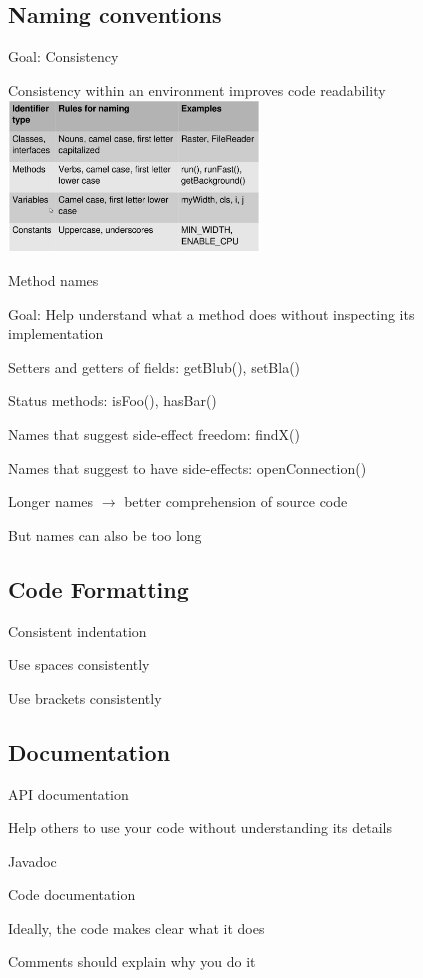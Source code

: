 \documentclass[10pt]{article}
\begin{document}
\subsection{Naming conventions}
\enumstart
	\item Goal: Consistency
	\item Consistency within an environment improves code readability
	\\ \includegraphics[width=0.5\textwidth]{java_naming_conventions.png}
	\item Method names
	\enumstart
		\item Goal: Help understand what a method does without inspecting its implementation
		\item Setters and getters of fields: getBlub(), setBla()
		\item Status methods: isFoo(), hasBar()
		\item Names that suggest side-effect freedom: findX()
		\item Names that suggest to have side-effects: openConnection()
	\enumend
	\item Longer names $\rightarrow$ better comprehension of source code
	\item But names can also be too long
\enumend

\subsection{Code Formatting}
\enumstart
	\item Consistent indentation
	\item Use spaces consistently
	\item Use brackets consistently
\enumend

\subsection{Documentation}
\enumstart
	\item API documentation
	\enumstart
		\item Help others to use your code without understanding its details
		\item Javadoc
	\enumend
	\item Code documentation
	\enumstart
		\item Ideally, the code makes clear what it does
		\item Comments should explain why you do it
	\enumend
\enumend
\end{document}
